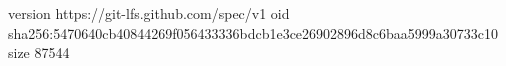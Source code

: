 version https://git-lfs.github.com/spec/v1
oid sha256:5470640cb40844269f056433336bdcb1e3ce26902896d8c6baa5999a30733c10
size 87544
